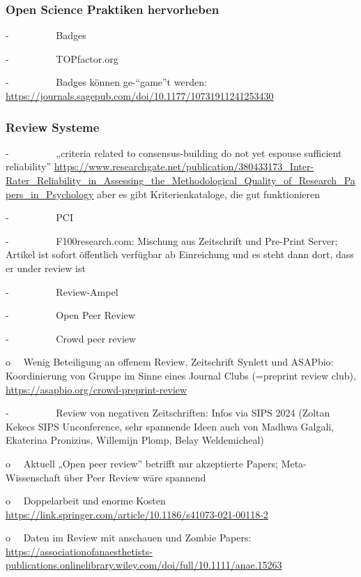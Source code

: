 \documentclass[
  letterpaper,
  DIV=11,
  numbers=noendperiod]{scrreprt}
\begin{document}
\subsubsection{Open Science Praktiken
hervorheben}\label{open-science-praktiken-hervorheben}

-~~~~~~~~~ Badges

-~~~~~~~~~ TOPfactor.org

-~~~~~~~~~ Badges können ge-``game''t werden:
\url{https://journals.sagepub.com/doi/10.1177/10731911241253430}

\subsubsection{Review Systeme}\label{review-systeme}

-~~~~~~~~~ „criteria related to consensus-building do not yet espouse
sufficient reliability''
\url{https://www.researchgate.net/publication/380433173_Inter-Rater_Reliability_in_Assessing_the_Methodological_Quality_of_Research_Papers_in_Psychology}
aber es gibt Kriterienkataloge, die gut funktionieren

-~~~~~~~~~ PCI

-~~~~~~~~~ F100research.com: Mischung aus Zeitschrift und Pre-Print
Server; Artikel ist sofort öffentlich verfügbar ab Einreichung und es
steht dann dort, dass er under review ist

-~~~~~~~~~ Review-Ampel

-~~~~~~~~~ Open Peer Review

-~~~~~~~~~ Crowd peer review

o~~ Wenig Beteiligung an offenem Review, Zeitschrift Synlett und
ASAPbio: Koordinierung von Gruppe im Sinne eines Journal Clubs
(=preprint review club), \url{https://asapbio.org/crowd-preprint-review}

-~~~~~~~~~ Review von negativen Zeitschriften: Infos via SIPS 2024
(Zoltan Kekecs SIPS Unconference, sehr spannende Ideen auch von Madhwa
Galgali, Ekaterina Pronizius, Willemijn Plomp, Belay Weldemicheal)

o~~ Aktuell „Open peer review'' betrifft nur akzeptierte Papers;
Meta-Wissenschaft über Peer Review wäre spannend

o~~ Doppelarbeit und enorme Kosten
\url{https://link.springer.com/article/10.1186/s41073-021-00118-2}

o~~ Daten im Review mit anschauen und Zombie Papers:
\url{https://associationofanaesthetists-publications.onlinelibrary.wiley.com/doi/full/10.1111/anae.15263}
\end{document}
